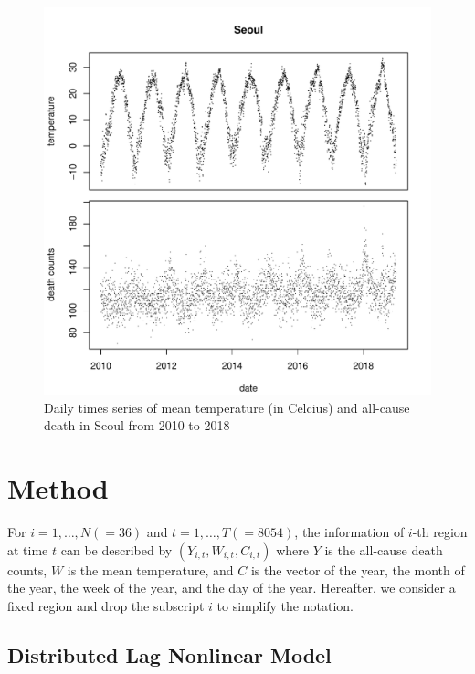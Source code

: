 \documentclass[12pt]{article}
\begin{document}
\begin{figure}
	\includegraphics[width = \textwidth]{figures/temporal-trend.pdf}
	\caption{
		Daily times series of 
		mean temperature (in Celcius) and all-cause death in Seoul from 2010 to 2018}
	\label{figure:temporal-trend}
\end{figure}


\section{Method} 
\label{section:method}

For $i = 1, \dots, N(=36)$ and $t = 1, \dots, T(=8054)$, 
the information of $i$-th region at time $t$ can be described by $(Y_{i,t}, W_{i,t}, C_{i,t})$ 
where $Y$ is the all-cause death counts, $W$ is the mean temperature, 
and $C$ is the vector of the year, the month of the year, the week of the year, and the day of the year.
Hereafter, we consider a fixed region and drop the subscript $i$ to simplify the notation.


\subsection{Distributed Lag Nonlinear Model}
\label{section:dlnm}
\end{document}
